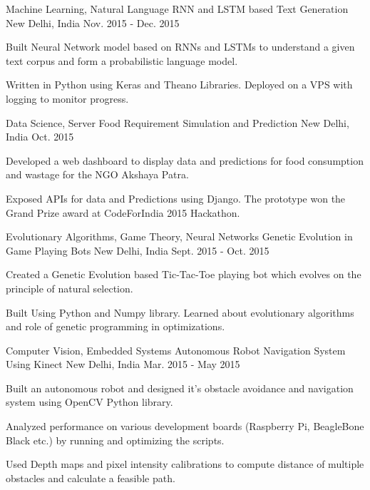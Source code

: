 \begin{cventries}
  \cventry
    {Machine Learning, Natural Language}
    {RNN and LSTM based Text Generation}
    {New Delhi, India}
    {Nov. 2015 - Dec. 2015}
    {
      \begin{cvitems}
        \item {Built Neural Network model based on RNNs and LSTMs to understand a given text corpus and form a probabilistic language model.}
        \item { Written in Python using Keras and Theano Libraries. Deployed on a VPS with logging to monitor progress.}
      \end{cvitems}
    }
  \cventry
    {Data Science, Server}
    {Food Requirement Simulation and Prediction}
    {New Delhi, India}
    {Oct. 2015}
    {
      \begin{cvitems}
        \item {Developed a web dashboard to display data and predictions for food consumption and wastage for the NGO Akshaya Patra.}
        \item {Exposed APIs for data and Predictions using Django. The prototype won the Grand Prize award at CodeForIndia 2015 Hackathon.}
      \end{cvitems} 
    }
  \cventry
    {Evolutionary Algorithms, Game Theory, Neural Networks}
    {Genetic Evolution in Game Playing Bots}
    {New Delhi, India}
    {Sept. 2015 - Oct. 2015}
    {
      \begin{cvitems}
        \item {Created a Genetic Evolution based Tic-Tac-Toe playing bot which evolves on the principle of natural selection.}
        \item {Built Using Python and Numpy library. Learned about evolutionary algorithms and role of genetic programming in optimizations.}
      \end{cvitems}
    }
  \cventry
    {Computer Vision, Embedded Systems}
    {Autonomous Robot Navigation System Using Kinect}
    {New Delhi, India}
    {Mar. 2015 - May 2015}
    {
      \begin{cvitems}
        \item {Built an autonomous robot and designed it’s obstacle avoidance and navigation system using OpenCV Python library.}
        \item {Analyzed performance on various development boards (Raspberry Pi, BeagleBone Black etc.) by running and optimizing the scripts.}
        \item {Used Depth maps and pixel intensity calibrations to compute distance of multiple obstacles and calculate a feasible path.}
      \end{cvitems} 
    }
\end{cventries}
